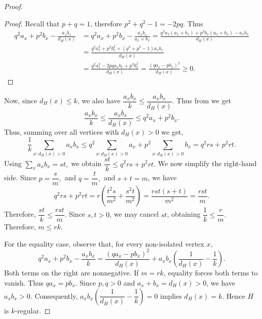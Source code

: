 \documentclass[10pt,a4paper]{amsart}
\begin{document}
\begin{proof}
   \begin{proof} Recall that $p+q =1$, therefore $p^2+q^2 -1 = -2pq$. Thus
\begin{align*}
q^2a_x+p^2b_x-\frac{a_xb_x}{d_H(x)}
&=
q^2a_x+p^2b_x-\frac{a_xb_x}{a_x+b_x}
=
\frac{
q^2a_x(a_x+b_x)
+
p^2b_x(a_x+b_x)
-
a_xb_x
}{d_H(x)}\\
&=
\frac{
q^2a_x^2+p^2b_x^2+
(q^2+p^2-1)a_xb_x
}{d_H(x)}\\
&=
\frac{q^2a_x^2-2pqa_xb_x+p^2b_x^2}{d_H(x)}
=
\frac{(qa_x-pb_x)^2}{d_H(x)}
\geq 0.
\end{align*}\end{proof}
Now, since $d_H(x)\leq k$, we also have
    $\dfrac{a_xb_x}{k}
    \leq
    \dfrac{a_xb_x}{d_H(x)}.$
Thus from  we get
$$
    \frac{a_xb_x}{k}
    \leq
    \frac{a_xb_x}{d_H(x)}
    \leq
    q^2a_x+p^2b_x.
$$
Thus, summing over all vertices with $d_H(x)>0$ we get,
$$
\frac{1}{k}\sum_{x:d_H(x)>0}a_xb_x
\leq
q^2\sum_{x:d_H(x)>0}a_x
+
p^2\sum_{x:d_H(x)>0}b_x=
q^2rs+p^2rt.
$$
Using $\sum_xa_xb_x=st,$ we obtain
    $\dfrac{st}{k}
    \leq
    q^2rs+p^2rt.$
We now simplify the right-hand side. Since
    $p=\dfrac{s}{m},$ and $q=\dfrac{t}{m},$
and $s+t=m$, we have
$$
q^2rs+p^2rt
=
r\left(
\frac{t^2s}{m^2}
+
\frac{s^2t}{m^2}
\right)=
\frac{rst(s+t)}{m^2}=
\frac{rst}{m}.
$$
Therefore, $\dfrac{st}{k}\leq\dfrac{rst}{m}.$
Since $s,t>0$, we may cancel $st$, obtaining
$\dfrac{1}{k}\leq\dfrac{r}{m}.$ Therefore,
    $m\leq rk.$
    
\vspace{2mm} 

For the equality case, observe that, for every non-isolated vertex $x$,
$$
q^{2}a_x+p^{2}b_x-\frac{a_xb_x}{k}
=
\frac{(qa_x-pb_x)^{2}}{d_H(x)}
+a_xb_x\left(\frac{1}{d_H(x)}-\frac{1}{k}\right).
$$
Both terms on the right are nonnegative. If $m=rk$, equality forces both
terms to vanish. Thus $qa_x=pb_x$. Since $p,q>0$ and
$a_x+b_x=d_H(x)>0$, we have $a_xb_x>0$. Consequently,
$a_xb_x\left(\dfrac{1}{d_H(x)}-\dfrac{1}{k}\right)=0$ implies $d_H(x)=k$. Hence $H$ is $k$-regular.
\end{proof}
\end{document}
